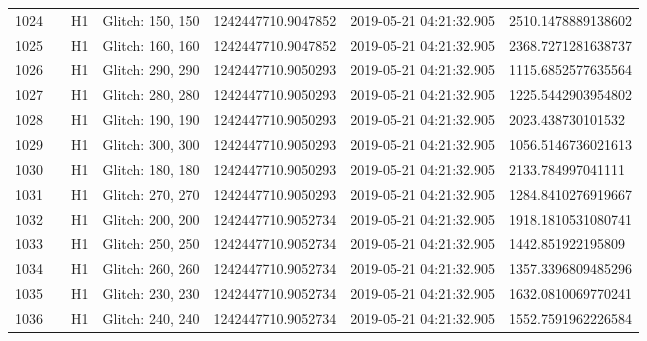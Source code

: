 \begin{longtable}{lllllll}
1024 &                                                    &       H1 &  Glitch: 150, 150 &  1242447710.9047852 &  2019-05-21 04:21:32.905 &  2510.1478889138602 \\
1025 &                                                    &       H1 &  Glitch: 160, 160 &  1242447710.9047852 &  2019-05-21 04:21:32.905 &  2368.7271281638737 \\
1026 &                                                    &       H1 &  Glitch: 290, 290 &  1242447710.9050293 &  2019-05-21 04:21:32.905 &  1115.6852577635564 \\
1027 &                                                    &       H1 &  Glitch: 280, 280 &  1242447710.9050293 &  2019-05-21 04:21:32.905 &  1225.5442903954802 \\
1028 &                                                    &       H1 &  Glitch: 190, 190 &  1242447710.9050293 &  2019-05-21 04:21:32.905 &   2023.438730101532 \\
1029 &                                                    &       H1 &  Glitch: 300, 300 &  1242447710.9050293 &  2019-05-21 04:21:32.905 &  1056.5146736021613 \\
1030 &                                                    &       H1 &  Glitch: 180, 180 &  1242447710.9050293 &  2019-05-21 04:21:32.905 &   2133.784997041111 \\
1031 &                                                    &       H1 &  Glitch: 270, 270 &  1242447710.9050293 &  2019-05-21 04:21:32.905 &  1284.8410276919667 \\
1032 &                                                    &       H1 &  Glitch: 200, 200 &  1242447710.9052734 &  2019-05-21 04:21:32.905 &  1918.1810531080741 \\
1033 &                                                    &       H1 &  Glitch: 250, 250 &  1242447710.9052734 &  2019-05-21 04:21:32.905 &   1442.851922195809 \\
1034 &                                                    &       H1 &  Glitch: 260, 260 &  1242447710.9052734 &  2019-05-21 04:21:32.905 &  1357.3396809485296 \\
1035 &                                                    &       H1 &  Glitch: 230, 230 &  1242447710.9052734 &  2019-05-21 04:21:32.905 &  1632.0810069770241 \\
1036 &                                                    &       H1 &  Glitch: 240, 240 &  1242447710.9052734 &  2019-05-21 04:21:32.905 &  1552.7591962226584 \\

\end{longtable}
